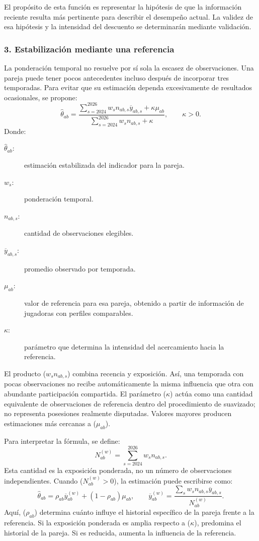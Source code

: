 El propósito de esta función es representar la hipótesis de que la información reciente resulta más pertinente para describir el desempeño actual. La validez de esa hipótesis y la intensidad del descuento se determinarán mediante validación.

\subsubsection*{3. Estabilización mediante una referencia}
La ponderación temporal no resuelve por sí sola la escasez de observaciones. Una pareja puede tener pocos antecedentes incluso después de incorporar tres temporadas. Para evitar que su estimación dependa excesivamente de resultados ocasionales, se propone:
\[
\widehat\theta_{ab}=\frac{\sum_{s=2024}^{2026}w_s n_{ab,s}\overline y_{ab,s}+\kappa\mu_{ab}}{\sum_{s=2024}^{2026}w_s n_{ab,s}+\kappa},\qquad \kappa>0.
\]
Donde:
\begin{description}
\item[$\widehat\theta_{ab}$:] estimación estabilizada del indicador para la pareja.
\item[$w_s$:] ponderación temporal.
\item[$n_{ab,s}$:] cantidad de observaciones elegibles.
\item[$\overline y_{ab,s}$:] promedio observado por temporada.
\item[$\mu_{ab}$:] valor de referencia para esa pareja, obtenido a partir de información de jugadoras con perfiles comparables.
\item[$\kappa$:] parámetro que determina la intensidad del acercamiento hacia la referencia.
\end{description}

El producto ($w_s n_{ab,s}$) combina recencia y exposición. Así, una temporada con pocas observaciones no recibe automáticamente la misma influencia que otra con abundante participación compartida. El parámetro ($\kappa$) actúa como una cantidad equivalente de observaciones de referencia dentro del procedimiento de suavizado; no representa posesiones realmente disputadas. Valores mayores producen estimaciones más cercanas a ($\mu_{ab}$).

Para interpretar la fórmula, se define:
\[
N_{ab}^{(w)}=\sum_{s=2024}^{2026}w_s n_{ab,s}.
\]
Esta cantidad es la exposición ponderada, no un número de observaciones independientes. Cuando ($N_{ab}^{(w)}>0$), la estimación puede escribirse como:
\[
\widehat\theta_{ab}=\rho_{ab}\overline y_{ab}^{(w)}+(1-\rho_{ab})\mu_{ab},
\qquad
\overline y_{ab}^{(w)}=\frac{\sum_s w_s n_{ab,s}\overline y_{ab,s}}{N_{ab}^{(w)}}.
\]
Aquí, ($\rho_{ab}$) determina cuánto influye el historial específico de la pareja frente a la referencia. Si la exposición ponderada es amplia respecto a ($\kappa$), predomina el historial de la pareja. Si es reducida, aumenta la influencia de la referencia.

